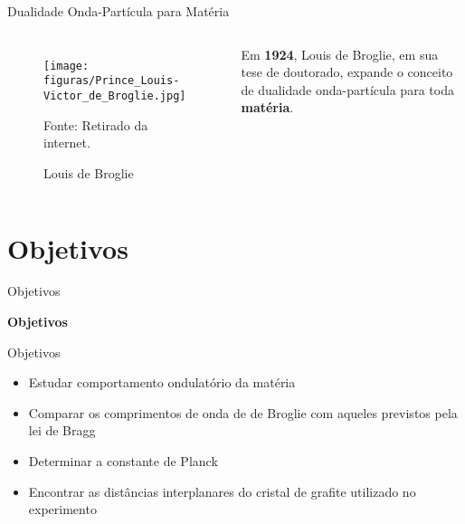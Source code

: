 \documentclass[aspectratio=169,12.5pt,xcolor=dvipsnames]{beamer}
\begin{document}

\begin{frame}{Dualidade Onda-Partícula para Matéria}

    \begin{columns}[c]

        \begin{figure}
          \centering
          \caption{Louis de Broglie}
          \texttt{[image: figuras/Prince\_Louis-Victor\_de\_Broglie.jpg]}\par
          {\scriptsize Fonte: Retirado da internet.}
        \end{figure}

        Em \textbf{1924}, Louis de Broglie, em sua tese de doutorado, expande o conceito de dualidade onda-partícula para toda \textbf{matéria}.

    \end{columns}

\end{frame}

\section{Objetivos}
\begin{frame}{Objetivos}
    \Huge{\centerline{\textbf{Objetivos}}}
\end{frame}

\begin{frame}{Objetivos}

\vspace{1\baselineskip}

    \begin{itemize}
        \item Estudar comportamento ondulatório da matéria
        
        \item Comparar os comprimentos de onda de de Broglie com aqueles previstos pela lei de Bragg
        
        \item Determinar a constante de Planck
        
        \item Encontrar as distâncias interplanares do cristal de grafite utilizado no experimento
    \end{itemize}
\end{frame}
\end{document}
